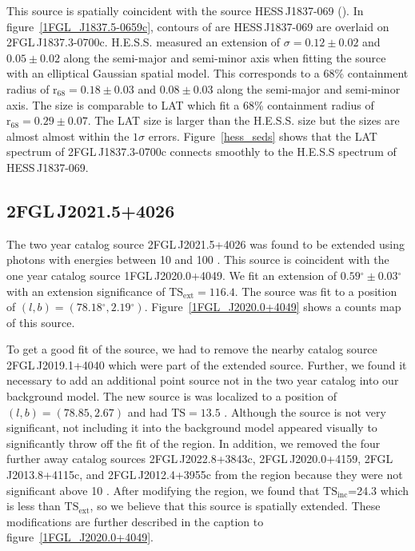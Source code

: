 \documentclass[12pt,preprint]{aastex}
\newcommand{\gev}{\text{GeV}\xspace}
\newcommand{\tev}{\text{TeV}\xspace}
\newcommand{\tsext}{{\ensuremath{\text{TS}_\text{ext}}}\xspace}
\newcommand{\tsinc}{\ensuremath{\text{TS}_\text{inc}}\xspace}
\newcommand{\rsixeight}{{\ensuremath{\text{r}_{68}}}\xspace}
\newcommand{\ts}{\text{TS}\xspace}
\renewcommand{\deg}{\ensuremath{^\circ}\xspace}
\begin{document}
This source is spatially coincident with the \tev
source HESS\,J1837-069 (\cite{hess_plane_survey}).  In
figure~\ref{1FGL_J1837.5-0659c}, contours of are HESS\,J1837-069
are overlaid on 2FGL\,J1837.3-0700c. H.E.S.S. measured an extension
of $\sigma=0.12\pm0.02$ and $0.05\pm0.02$ along the semi-major and
semi-minor axis when fitting the source with an elliptical Gaussian
spatial model.  This corresponds to a 68\% containment radius of
$\rsixeight=0.18\pm0.03$ and $0.08\pm0.03$ along the semi-major
and semi-minor axis. The size is comparable to LAT which fit a 68\%
containment radius of $\rsixeight=0.29\pm0.07$.  The LAT size is larger
than the H.E.S.S. size but the sizes are almost almost within the
$1\sigma$ errors. Figure~\ref{hess_seds} shows that the LAT spectrum
of 2FGL\,J1837.3-0700c connects smoothly to the H.E.S.S spectrum of
HESS\,J1837-069.




\subsection{2FGL\,J2021.5+4026}
\label{section_2FGL J2021.5+4026}



The two year catalog source 2FGL\,J2021.5+4026 was found to be
extended using photons with energies between 10 \gev and 100
\gev. This source is coincident with the one year catalog source
1FGL\,J2020.0+4049. We fit an extension of $0.59\deg\pm0.03\deg$ with
an extension significance of $\tsext=116.4$.  The source was fit to a
position of $(l,b)=(78.18\deg,2.19\deg)$.  Figure~\ref{1FGL_J2020.0+4049}
shows a counts map of this source.

To get a good fit of the source, we had to remove the nearby catalog
source 2FGL\,J2019.1+4040 which were part of the extended source.
Further, we found it necessary to add an additional point source not in
the two year catalog into our background model.  The new source is was
localized to a position of $(l,b)=(78.85,2.67)$ and had $\ts=13.5$ .
Although the source is not very significant, not including it into the
background model appeared visually to significantly throw off the fit
of the region.  In addition, we removed the four further away catalog
sources 2FGL\,J2022.8+3843c, 2FGL\,J2020.0+4159, 2FGL\,J2013.8+4115c,
and 2FGL\,J2012.4+3955c from the region because they were not significant
above 10 \gev.  After modifying the region, we found that \tsinc=24.3
which is less than \tsext, so we believe that this source is spatially
extended.  These modifications are further described in the caption to
figure~\ref{1FGL_J2020.0+4049}.
\end{document}
